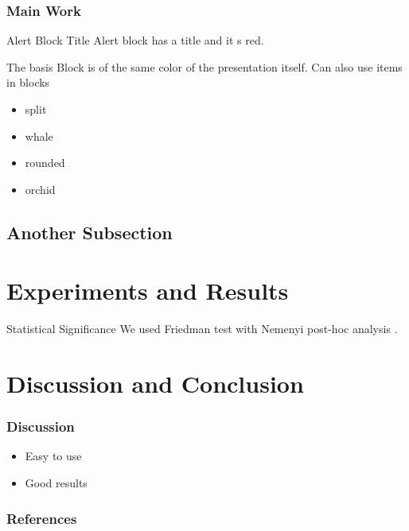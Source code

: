 \documentclass{beamer}
\begin{document}
\begin{frame}
  \frametitle{Main Work}

   \begin{alertblock}{Alert Block Title}
Alert block has a title and it s red.
\end{alertblock}

\begin{block}{The basis}
Block is of the same color of the presentation itself.
Can also use items in blocks
\begin{itemize}
  \item split
  \item whale
  \item rounded
  \item orchid
\end{itemize}
\end{block}


\end{frame}

\subsection{Another Subsection}


\section{Experiments and Results}

\begin{frame}{Statistical Significance}
    We used Friedman test with Nemenyi post-hoc analysis \cite{demvsar2006statistical}.
\end{frame}

\section{Discussion and Conclusion}

\begin{frame}
  \frametitle{Discussion}

  \begin{itemize}
    \item Easy to use
    \item Good results
  \end{itemize}
\end{frame}


\begingroup
\tiny   %
\begin{frame}[allowframebreaks] %
    \frametitle{References}
    
     
\end{frame}
\endgroup
\end{document}
